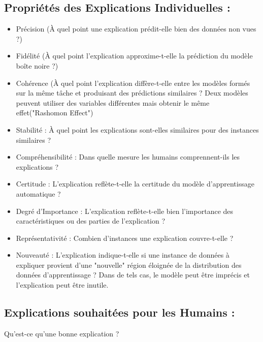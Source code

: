 \subsection{Propriétés des Explications Individuelles :}

\begin{itemize}
   \item Précision (À quel point une explication prédit-elle bien des données non vues ?)
   \item Fidélité (À quel point l'explication approxime-t-elle la prédiction du modèle boîte noire ?)
   \item Cohérence (À quel point l'explication diffère-t-elle entre les modèles formés sur la même tâche et produisant des prédictions similaires ? Deux modèles peuvent utiliser des variables différentes mais obtenir le même effet("Rashomon Effect")
   \item Stabilité : À quel point les explications sont-elles similaires pour des instances similaires ?
   \item Compréhensibilité : Dans quelle mesure les humains comprennent-ils les explications ?
   \item Certitude : L'explication reflète-t-elle la certitude du modèle d'apprentissage automatique ?
   \item Degré d'Importance : L'explication reflète-t-elle bien l'importance des caractéristiques ou des parties de l'explication ?
   \item Représentativité : Combien d'instances une explication couvre-t-elle ?
   \item Nouveauté : L'explication indique-t-elle si une instance de données à expliquer provient d'une "nouvelle" région éloignée de la distribution des données d'apprentissage ? Dans de tels cas, le modèle peut être imprécis et l'explication peut être inutile.
\end{itemize}

\subsection{Explications souhaitées pour les Humains :}

Qu'est-ce qu'une bonne explication ?

